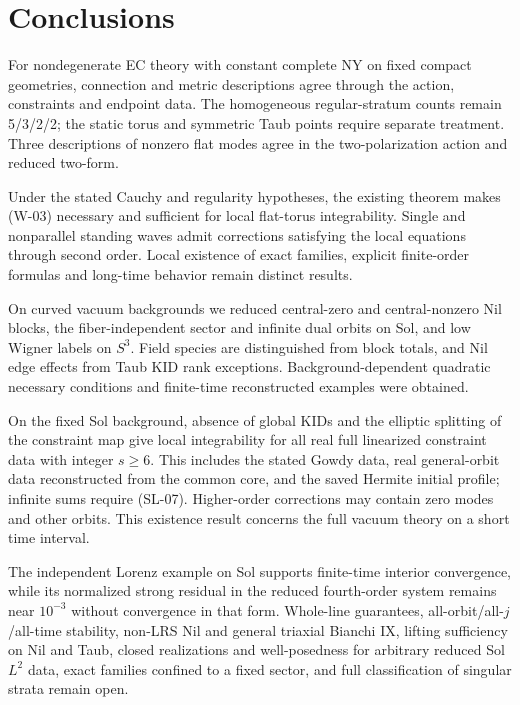 \section{Conclusions}

For nondegenerate EC theory with constant complete NY on fixed compact geometries, connection and metric descriptions agree through the action, constraints and endpoint data. The homogeneous regular-stratum counts remain 5/3/2/2; the static torus and symmetric Taub points require separate treatment. Three descriptions of nonzero flat modes agree in the two-polarization action and reduced two-form.

Under the stated Cauchy and regularity hypotheses, the existing theorem makes (W-03) necessary and sufficient for local flat-torus integrability. Single and nonparallel standing waves admit corrections satisfying the local equations through second order. Local existence of exact families, explicit finite-order formulas and long-time behavior remain distinct results.

On curved vacuum backgrounds we reduced central-zero and central-nonzero Nil blocks, the fiber-independent sector and infinite dual orbits on Sol, and low Wigner labels on $S^3$. Field species are distinguished from block totals, and Nil edge effects from Taub KID rank exceptions. Background-dependent quadratic necessary conditions and finite-time reconstructed examples were obtained.

On the fixed Sol background, absence of global KIDs and the elliptic splitting of the constraint map give local integrability for all real full linearized constraint data with integer $s\ge6$. This includes the stated Gowdy data, real general-orbit data reconstructed from the common core, and the saved Hermite initial profile; infinite sums require (SL-07). Higher-order corrections may contain zero modes and other orbits. This existence result concerns the full vacuum theory on a short time interval.

The independent Lorenz example on Sol supports finite-time interior convergence, while its normalized strong residual in the reduced fourth-order system remains near $10^{-3}$ without convergence in that form. Whole-line guarantees, all-orbit/all-$j$/all-time stability, non-LRS Nil and general triaxial Bianchi IX, lifting sufficiency on Nil and Taub, closed realizations and well-posedness for arbitrary reduced Sol $L^2$ data, exact families confined to a fixed sector, and full classification of singular strata remain open.
